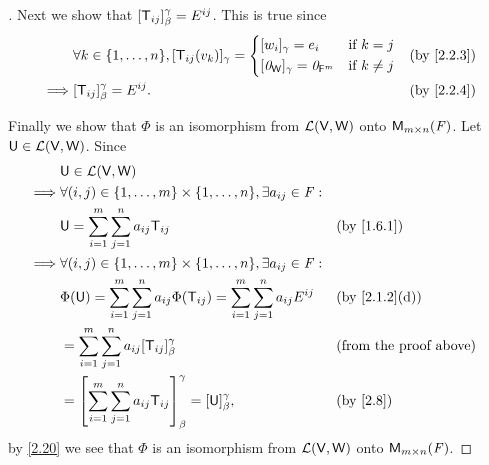 \begin{proof}[]
  Next we show that \([\mathsf{T}_{i j}]_{\beta}^{\gamma} = E^{i j}\).
  This is true since
  \begin{align*}
             & \forall k \in \set{1, \dots, n}, [\T_{i j}(v_k)]_{\gamma} = \begin{dcases}
                                                                             [w_i]_{\gamma} = e_i                 & \text{if } k = j    \\
                                                                             [\zv_{\W}]_{\gamma} = \zv_{\vs{F}^m} & \text{if } k \neq j
                                                                           \end{dcases} &  & \text{(by \cref{2.2.3})} \\
    \implies & [\T_{i j}]_{\beta}^{\gamma} = E^{i j}.                                       &  & \text{(by \cref{2.2.4})}
  \end{align*}

  Finally we show that \(\Phi\) is an isomorphism from \(\mathcal{L}(\mathsf{V}, \mathsf{W})\) onto \(\mathsf{M}_{{m} \times n}({\mathit{F}})\).
  Let \(\mathsf{U} \in \mathcal{L}(\mathsf{V}, \mathsf{W})\).
  Since
  \begin{align*}
             & \U \in \ls(\V, \W)                                                                                                                                 \\
    \implies & \forall (i, j) \in \set{1, \dots, m} \times \set{1, \dots, n}, \exists a_{i j} \in \F :                                                            \\
             & \U = \sum_{i = 1}^m \sum_{j = 1}^n a_{i j} \T_{i j}                                                             &  & \text{(by \cref{1.6.1})}      \\
    \implies & \forall (i, j) \in \set{1, \dots, m} \times \set{1, \dots, n}, \exists a_{i j} \in \F :                                                            \\
             & \Phi(\U) = \sum_{i = 1}^m \sum_{j = 1}^n a_{i j} \Phi(\T_{i j}) = \sum_{i = 1}^m \sum_{j = 1}^n a_{i j} E^{i j} &  & \text{(by \cref{2.1.2}(d))}   \\
             & = \sum_{i = 1}^m \sum_{j = 1}^n a_{i j} [\T_{i j}]_{\beta}^{\gamma}                                             &  & \text{(from the proof above)} \\
             & = \br{\sum_{i = 1}^m \sum_{j = 1}^n a_{i j} \T_{i j}}_{\beta}^{\gamma} = [\U]_{\beta}^{\gamma},                 &  & \text{(by \cref{2.8})}
  \end{align*}
  by \cref{2.20} we see that \(\Phi\) is an isomorphism from \(\mathcal{L}(\mathsf{V}, \mathsf{W})\) onto \(\mathsf{M}_{{m} \times n}({\mathit{F}})\).
\end{proof}
